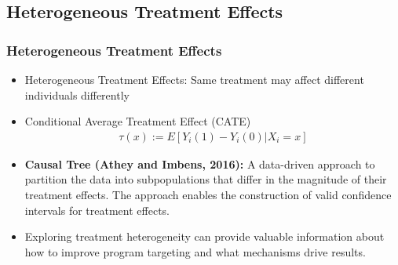 \documentclass[
  shownotes,
  xcolor={svgnames},
  hyperref={colorlinks,citecolor=DarkBlue,linkcolor=DarkRed,urlcolor=DarkBlue}
  , aspectratio=169]{beamer}
\begin{document}
\subsection{Heterogeneous Treatment Effects}
\begin{frame}[fragile]
\frametitle{Heterogeneous Treatment Effects}

\begin{itemize}
  \item Heterogeneous Treatment Effects: Same treatment may affect different individuals differently
  \medskip
  \item Conditional Average Treatment Effect (CATE)
  \begin{align}
    \tau(x) := E[Y_i(1) - Y_i(0)|X_i=x]
  \end{align}

  \item \textbf{Causal Tree (Athey and Imbens, 2016):} A data-driven approach to partition the data into subpopulations that differ in the magnitude of their treatment effects. The approach enables the construction of valid confidence intervals for treatment effects.
  \medskip
  \item Exploring treatment heterogeneity can provide valuable information about how to improve program targeting and what mechanisms drive results.
\end{itemize}


\end{frame}
\end{document}
